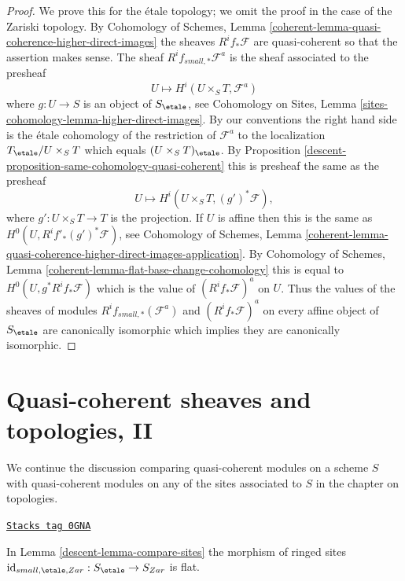 \begin{proof}

We prove this for the \'etale topology; we omit the proof in the case
of the Zariski topology. By Cohomology of Schemes, Lemma
\ref{coherent-lemma-quasi-coherence-higher-direct-images}
the sheaves $R^if_*\mathcal{F}$ are quasi-coherent so that the assertion
makes sense. The sheaf $R^if_{small, *}\mathcal{F}^a$ is the sheaf associated
to the presheaf
$$
U \longmapsto H^i(U \times_S T, \mathcal{F}^a)
$$
where $g : U \to S$ is an object of $S_\etale$, see
Cohomology on Sites, Lemma \ref{sites-cohomology-lemma-higher-direct-images}.
By our conventions the right hand side is the \'etale
cohomology of the restriction of $\mathcal{F}^a$ to the localization
$T_\etale/U \times_S T$ which equals
$(U \times_S T)_\etale$. By
Proposition \ref{descent-proposition-same-cohomology-quasi-coherent}
this is presheaf the same as the presheaf
$$
U \longmapsto
H^i(U \times_S T, (g')^*\mathcal{F}),
$$
where $g' : U \times_S T \to T$ is the projection. If $U$ is affine
then this is the same as $H^0(U, R^if'_*(g')^*\mathcal{F})$, see
Cohomology of Schemes, Lemma
\ref{coherent-lemma-quasi-coherence-higher-direct-images-application}.
By
Cohomology of Schemes, Lemma \ref{coherent-lemma-flat-base-change-cohomology}
this is equal to $H^0(U, g^*R^if_*\mathcal{F})$ which is the value
of $(R^if_*\mathcal{F})^a$ on $U$.
Thus the values of the sheaves of modules
$R^if_{small, *}(\mathcal{F}^a)$ and $(R^if_*\mathcal{F})^a$
on every affine object of $S_\etale$ are canonically isomorphic
which implies they are canonically isomorphic.
\end{proof}

\section{Quasi-coherent sheaves and topologies, II}
\label{descent-section-quasi-coherent-sheaves-bis}
We continue the discussion comparing quasi-coherent modules on a scheme $S$
with quasi-coherent modules on any of the sites associated to $S$
in the chapter on topologies.


\begin{lemma}
\label{descent-lemma-compare-etale-zariski-flat}
\href{https://stacks.math.columbia.edu/tag/0GNA}{\texttt{Stacks tag 0GNA}}

In Lemma \ref{descent-lemma-compare-sites} the morphism of ringed
sites $\text{id}_{small, \etale, Zar} : S_\etale \to S_{Zar}$ is flat.
\end{lemma}

